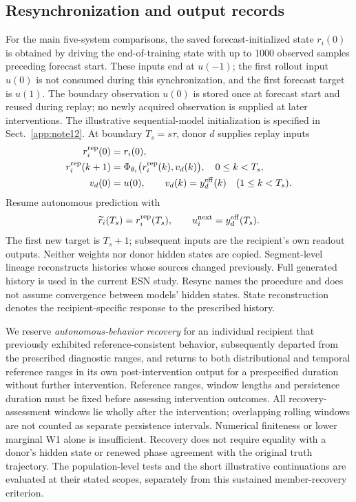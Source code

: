 \documentclass[gmd,manuscript]{copernicus}
\begin{document}
\subsection{Resynchronization and output records}
For the main five-system comparisons, the saved forecast-initialized state $r_i(0)$ is obtained by driving the end-of-training state with up to 1000 observed samples preceding forecast start. These inputs end at $u(-1)$; the first rollout input $u(0)$ is not consumed during this synchronization, and the first forecast target is $u(1)$. The boundary observation $u(0)$ is stored once at forecast start and reused during replay; no newly acquired observation is supplied at later interventions. The illustrative sequential-model initialization is specified in Sect.~\ref{app:note12}. At boundary $T_s=s\tau$, donor $d$ supplies replay inputs
\begin{align}
r_i^{\rm rep}(0)&=r_i(0),\\
r_i^{\rm rep}(k+1)&=\Phi_{\theta_i}\big(r_i^{\rm rep}(k),v_d(k)\big),\quad 0\leq k<T_s,\\
v_d(0)&=u(0),\qquad v_d(k)=y_d^{\rm eff}(k)\quad(1\leq k<T_s).
\end{align}
Resume autonomous prediction with
\begin{equation}
\widetilde r_i(T_s)=r_i^{\rm rep}(T_s),\qquad u_i^{\rm next}=y_d^{\rm eff}(T_s).
\end{equation}
The first new target is $T_s+1$; subsequent inputs are the recipient's own readout outputs. Neither weights nor donor hidden states are copied. Segment-level lineage reconstructs histories whose sources changed previously. Full generated history is used in the current ESN study. Resync names the procedure and does not assume convergence between models' hidden states. State reconstruction denotes the recipient-specific response to the prescribed history.

We reserve \emph{autonomous-behavior recovery} for an individual recipient that previously exhibited reference-consistent behavior, subsequently departed from the prescribed diagnostic ranges, and returns to both distributional and temporal reference ranges in its own post-intervention output for a prespecified duration without further intervention. Reference ranges, window lengths and persistence duration must be fixed before assessing intervention outcomes. All recovery-assessment windows lie wholly after the intervention; overlapping rolling windows are not counted as separate persistence intervals. Numerical finiteness or lower marginal W1 alone is insufficient. Recovery does not require equality with a donor's hidden state or renewed phase agreement with the original truth trajectory. The population-level tests and the short illustrative continuations are evaluated at their stated scopes, separately from this sustained member-recovery criterion.
\end{document}
